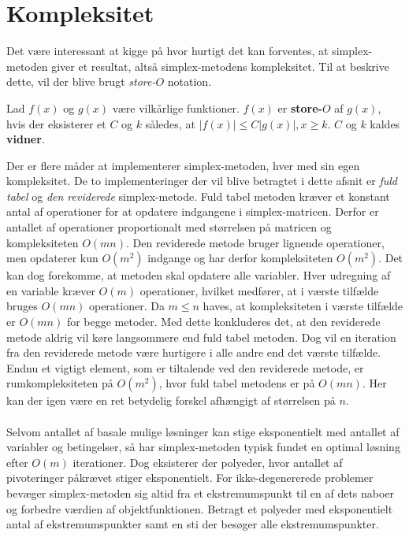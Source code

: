 \section{Kompleksitet}
\label{kompleksitet}
Det være interessant at kigge på hvor hurtigt det kan forventes, at simplex-metoden giver et resultat, altså simplex-metodens kompleksitet.
Til at beskrive dette, vil der blive brugt \textit{store-$O$} notation.
%
\begin{defn}{}{}
Lad $f(x)$ og $g(x)$ være vilkårlige funktioner. $f(x)$ er \textbf{store-$O$} af $g(x)$, hvis der eksisterer et $C$ og $k$ således, at $|f(x)| \leq C|g(x)|, x \geq k$. $C$ og $k$ kaldes \textbf{vidner}.
\end{defn}\noindent
%
Der er flere måder at implementerer simplex-metoden, hver med sin egen kompleksitet.
De to implementeringer der vil blive betragtet i dette afsnit er \textit{fuld tabel} og \textit{den reviderede} simplex-metode.
%
Fuld tabel metoden kræver et konstant antal af operationer for at opdatere indgangene i simplex-matricen.
Derfor er antallet af operationer proportionalt med størrelsen på matricen og kompleksiteten $O(mn)$.
Den reviderede metode bruger lignende operationer, men opdaterer kun $O(m^2)$ indgange og har derfor kompleksiteten $O(m^2)$.
Det kan dog forekomme, at metoden skal opdatere alle variabler.
Hver udregning af en variable kræver $O(m)$ operationer, hvilket medfører, at i værste tilfælde bruges $O(mn)$ operationer.
Da $m \leq n$ haves, at kompleksiteten i værste tilfælde er $O(mn)$ for begge metoder.
Med dette konkluderes det, at den reviderede metode aldrig vil køre langsommere end fuld tabel metoden.
Dog vil en iteration fra den reviderede metode være hurtigere i alle andre end det værste tilfælde.
Endnu et vigtigt element, som er tiltalende ved den reviderede metode, er rumkompleksiteten på $O(m^2)$, hvor fuld tabel metodens er på $O(mn)$.
Her kan der igen være en ret betydelig forskel afhængigt af størrelsen på $n$.\\\\
%
Selvom antallet af basale mulige løsninger kan stige eksponentielt med antallet af variabler og betingelser, så har simplex-metoden typisk fundet en optimal løsning efter $O(m)$ iterationer.
Dog eksisterer der polyeder, hvor antallet af pivoteringer påkrævet stiger eksponentielt.
For ikke-degenererede problemer bevæger simplex-metoden sig altid fra et ekstremumspunkt til en af dets naboer og forbedre værdien af objektfunktionen.
Betragt et polyeder med eksponentielt antal af ekstremumspunkter samt en sti der besøger alle ekstremumspunkter.

